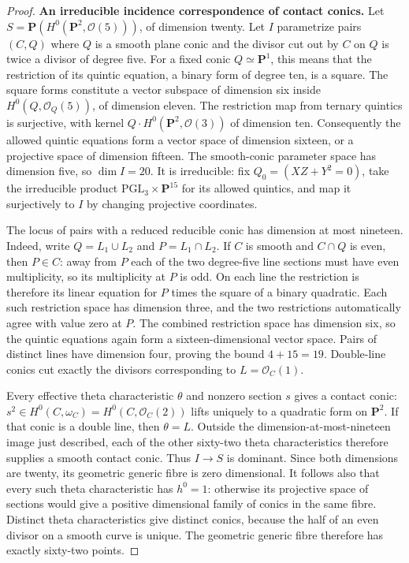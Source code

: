 \begin{proof}
\par\smallskip\noindent\textbf{An irreducible incidence correspondence of contact conics.}
Let $S=\mathbf P(H^0(\mathbf P^2,\mathcal O(5)))$, of dimension twenty.
Let $I$ parametrize pairs $(C,Q)$ where $Q$ is a smooth plane conic
and the divisor cut out by $C$ on $Q$ is twice a divisor of degree five.
For a fixed conic $Q\simeq\mathbf P^1$, this means that the restriction
of its quintic equation, a binary form of degree ten, is a square.
The square forms constitute a vector subspace of dimension six inside
$H^0(Q,\mathcal O_Q(5))$, of dimension eleven.  The restriction map
from ternary quintics is surjective, with kernel
$Q\cdot H^0(\mathbf P^2,\mathcal O(3))$ of dimension ten.
Consequently the allowed quintic equations form a vector space of
dimension sixteen, or a projective space of dimension fifteen.
The smooth-conic parameter space has dimension five, so $\dim I=20$.
It is irreducible: fix $Q_0=(XZ+Y^2=0)$, take the irreducible product
$\mathrm{PGL}_3\times\mathbf P^{15}$ for its allowed quintics, and
map it surjectively to $I$ by changing projective coordinates.

The locus of pairs with a reduced reducible conic has dimension at
most nineteen.  Indeed, write $Q=L_1\cup L_2$ and $P=L_1\cap L_2$.
If $C$ is smooth and $C\cap Q$ is even, then $P\in C$: away from $P$
each of the two degree-five line sections must have even multiplicity,
so its multiplicity at $P$ is odd.  On each line the restriction is
therefore its linear equation for $P$ times the square of a binary
quadratic.  Each such restriction space has dimension three, and the
two restrictions automatically agree with value zero at $P$.
The combined restriction space has dimension six, so the quintic
equations again form a sixteen-dimensional vector space.
Pairs of distinct lines have dimension four, proving the bound
$4+15=19$.  Double-line conics cut exactly the divisors corresponding
to $L=\mathcal O_C(1)$.

Every effective theta characteristic $\theta$ and nonzero section $s$
gives a contact conic: $s^2\in H^0(C,\omega_C)=H^0(C,\mathcal O_C(2))$
lifts uniquely to a quadratic form on $\mathbf P^2$.
If that conic is a double line, then $\theta=L$.
Outside the dimension-at-most-nineteen image just described, each of
the other sixty-two theta characteristics therefore supplies a smooth
contact conic.  Thus $I\to S$ is dominant.  Since both dimensions are
twenty, its geometric generic fibre is zero dimensional.
It follows also that every such theta characteristic has $h^0=1$:
otherwise its projective space of sections would give a positive
dimensional family of conics in the same fibre.  Distinct theta
characteristics give distinct conics, because the half of an even
divisor on a smooth curve is unique.  The geometric generic fibre
therefore has exactly sixty-two points.


\end{proof}
